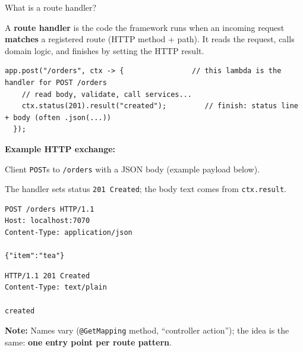 \question[4]
What is a route handler?
\begin{solutionorbox}[1.00in]
  A \textbf{route handler} is the code the framework runs when an incoming request \textbf{matches} a registered route (HTTP method + path). It reads the request, calls domain logic, and finishes by setting the HTTP result.

  \begin{lstlisting}[style=java]
  app.post("/orders", ctx -> {                // this lambda is the handler for POST /orders
    // read body, validate, call services...
    ctx.status(201).result("created");         // finish: status line + body (often .json(...))
  });
  \end{lstlisting}

  \noindent\textbf{Example HTTP exchange:}\par
  \noindent Client \texttt{POST}s to \texttt{/orders} with a JSON body (example payload below).\par
  \noindent The handler sets status \texttt{201~Created}; the body text comes from \texttt{ctx.result}.\par
  \begin{httpexchange}
\begin{lstlisting}[style=http]
POST /orders HTTP/1.1
Host: localhost:7070
Content-Type: application/json

{"item":"tea"}
\end{lstlisting}
\httpmidarrows
\begin{lstlisting}[style=http]
HTTP/1.1 201 Created
Content-Type: text/plain

created
\end{lstlisting}
  \end{httpexchange}

  \noindent\textbf{Note:} Names vary (\texttt{@GetMapping} method, ``controller action''); the idea is the same: \textbf{one entry point per route pattern}.
\end{solutionorbox}


\newpage


